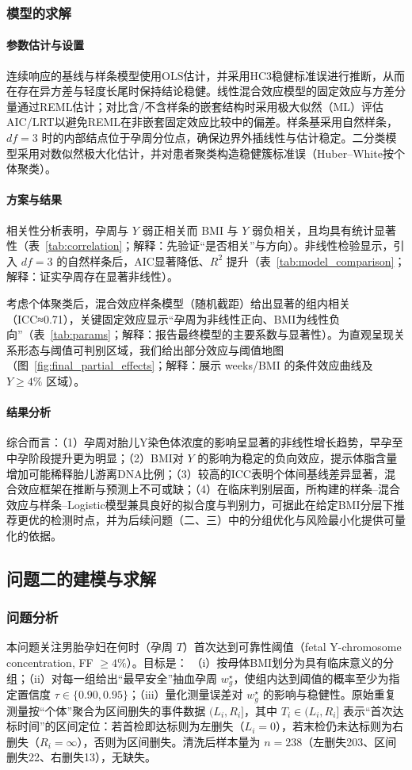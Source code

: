\documentclass[withoutpreface]{cumcmthesis}
\begin{document}
\subsubsection{模型的求解}
\paragraph{参数估计与设置}
连续响应的基线与样条模型使用OLS估计，并采用HC3稳健标准误进行推断，从而在存在异方差与轻度长尾时保持结论稳健。线性混合效应模型的固定效应与方差分量通过REML估计；对比含/不含样条的嵌套结构时采用极大似然（ML）评估AIC/LRT以避免REML在非嵌套固定效应比较中的偏差。样条基采用自然样条，$df=3$ 时的内部结点位于孕周分位点，确保边界外插线性与估计稳定。二分类模型采用对数似然极大化估计，并对患者聚类构造稳健簇标准误（Huber–White按个体聚类）。

\paragraph{方案与结果}
相关性分析表明，孕周与 $Y$ 弱正相关而 BMI 与 $Y$ 弱负相关，且均具有统计显著性（表~\ref{tab:correlation}；解释：先验证“是否相关”与方向）。非线性检验显示，引入 $df=3$ 的自然样条后，AIC显著降低、$R^2$ 提升（表~\ref{tab:model_comparison}；解释：证实孕周存在显著非线性）。

考虑个体聚类后，混合效应样条模型（随机截距）给出显著的组内相关（ICC≈0.71），关键固定效应显示“孕周为非线性正向、BMI为线性负向”（表~\ref{tab:params}；解释：报告最终模型的主要系数与显著性）。为直观呈现关系形态与阈值可判别区域，我们给出部分效应与阈值地图（图~\ref{fig:final_partial_effects}；解释：展示 weeks/BMI 的条件效应曲线及 $Y\ge4\%$ 区域）。

\paragraph{结果分析}
综合而言：（1）孕周对胎儿Y染色体浓度的影响呈显著的非线性增长趋势，早孕至中孕阶段提升更为明显；（2）BMI对 $Y$ 的影响为稳定的负向效应，提示体脂含量增加可能稀释胎儿游离DNA比例；（3）较高的ICC表明个体间基线差异显著，混合效应框架在推断与预测上不可或缺；（4）在临床判别层面，所构建的样条–混合效应与样条–Logistic模型兼具良好的拟合度与判别力，可据此在给定BMI分层下推荐更优的检测时点，并为后续问题（二、三）中的分组优化与风险最小化提供可量化的依据。

\subsection{问题二的建模与求解}
\subsubsection{问题分析}
本问题关注男胎孕妇在何时（孕周 $T$）首次达到可靠性阈值（fetal Y-chromosome concentration, FF $\ge 4\%$）。目标是：
（i）按母体BMI划分为具有临床意义的分组；（ii）对每一组给出“最早安全”抽血孕周 $w_g^{\star}$，使组内达到阈值的概率至少为指定置信度 $\tau\in\{0.90,0.95\}$；（iii）量化测量误差对 $w_g^{\star}$ 的影响与稳健性。原始重复测量按“个体”聚合为区间删失的事件数据 $(L_i,R_i]$，其中 $T_i\in(L_i,R_i]$ 表示“首次达标时间”的区间定位：若首检即达标则为左删失（$L_i=0$），若末检仍未达标则为右删失（$R_i=\infty$），否则为区间删失。清洗后样本量为 $n=238$（左删失203、区间删失22、右删失13），无缺失。
\end{document}
